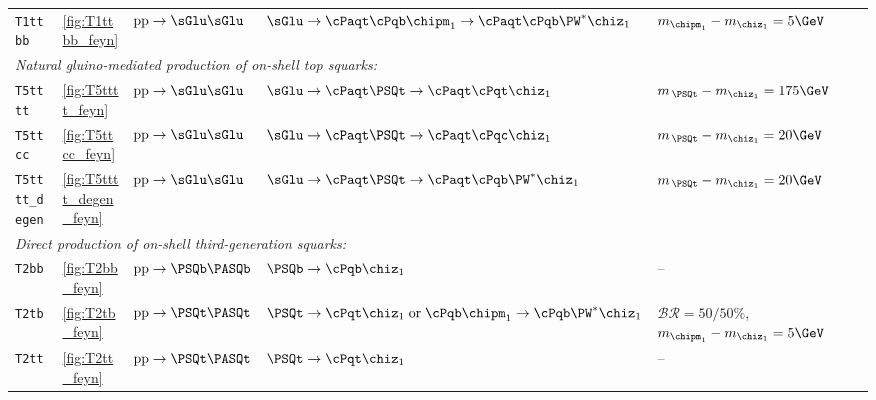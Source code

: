 \begin{table}[tb]
\begin{tabular}{ lllll }
\texttt{T1ttbb}        & \ref{fig:T1ttbb_feyn} 
                       & $\text{pp}\ra\sGlu\sGlu$      
                       & $\sGlu\ra\cPaqt\cPqb\chipm_1\ra\cPaqt\cPqb\PW^*\chiz_1$
                       & $m_{\chipm_1} - m_{\chiz_1} = 5\GeV$                                           \\ [0.5ex]
\multicolumn{5}{l}{\it Natural gluino-mediated production of on-shell top squarks:}                     \\ [0.5ex]
\texttt{T5tttt}        & \ref{fig:T5tttt_feyn}
                       & $\text{pp}\ra\sGlu\sGlu$      
                       & $\sGlu\ra\cPaqt\PSQt\ra\cPaqt\cPqt\chiz_1$ 
                       & $m_{\,\PSQt} - m_{\chiz_1} = 175\GeV$                                          \\ [0.5ex]
\texttt{T5ttcc}        & \ref{fig:T5ttcc_feyn}            
                       & $\text{pp}\ra\sGlu\sGlu$       
                       & $\sGlu\ra\cPaqt\PSQt\ra\cPaqt\cPqc\chiz_1$ 
                       & $m_{\,\PSQt} - m_{\chiz_1} = 20\GeV$                                           \\ [0.5ex]
\texttt{T5tttt\_degen} & \ref{fig:T5tttt_degen_feyn}
                       & $\text{pp}\ra\sGlu\sGlu$      
                       & $\sGlu\ra\cPaqt\PSQt\ra\cPaqt\cPqb\PW^*\chiz_1$
                       & $m_{\,\PSQt} - m_{\chiz_1} = 20\GeV$                                           \\ [0.5ex]
\multicolumn{5}{l}{\it Direct production of on-shell third-generation squarks:}                         \\ [0.5ex]
\texttt{T2bb}          & \ref{fig:T2bb_feyn}
                       & $\text{pp}\ra\PSQb\PASQb$     
                       & $\PSQb\ra\cPqb\chiz_1$
                       & --                                                                             \\ [0.5ex]
\texttt{T2tb}          & \ref{fig:T2tb_feyn}
                       & $\text{pp}\ra\PSQt\PASQt$     
                       & $\PSQt\ra\cPqt\chiz_1 \;\text{or}\; \cPqb\chipm_1\ra\cPqb\PW^*\chiz_1$
                       & $\mathcal{BR} = 50/50\%$, $m_{\chipm_1} - m_{\chiz_1} = 5\GeV$                 \\ [0.5ex]
\texttt{T2tt}          & \ref{fig:T2tt_feyn}
                       & $\text{pp}\ra\PSQt\PASQt$
                       & $\PSQt\ra\cPqt\chiz_1$
                       & --                                                                             \\ [0.5ex]

\end{tabular}
\end{table}
